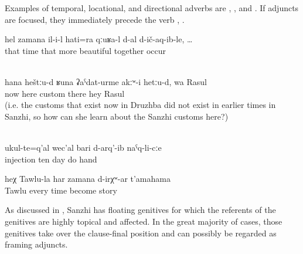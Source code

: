 Examples of temporal, locational, and directional adverbs are , , and  . If adjuncts are focused, they immediately precede the verb , .
%
\begin{exe}
	\ex	\label{ex:‎At that time he embellished his story even more}
	\gll	hel	zamana	il-i-l	hati=ra	qːuʁa-l	d-al d-ič-aq-ib-le, \ldots\\
		that	time	that	more	beautiful	\tsc{npl-}together	occur\\
	\glt	{}

	\\\label{ex:‎Now such customs as here were not there, Rasul}%
	\gll	hana	heštːu-d	ʁuna	ʡaˁdat-urme	akːʷ-i	hetːu-d,	wa	Rasul\\
		now	here		custom		there	hey	Rasul\\
	\glt	{} (i.e. the customs that exist now in Druzhba did not exist in earlier times in Sanzhi, so how can she learn about the Sanzhi customs here?)
	
	
	\\	\label{ex:‎‎‎They made injections into the hand for ten days}
	\gll	ukul-te=q'al	wec'al	bari	d-arq'-ib	naˁq-li-cːe\\
		injection	ten	day	do	hand\\
	\glt	{}


	\ex	\label{ex:‎With Tawlu always such stories happen}
	\gll	heχ	Tawlu-la	har	zamana	d-irχʷ-ar	t'amahama\\
			Tawlu	every	time	become	story\\
	\glt	{}
\end{exe}

As discussed in , Sanzhi has floating genitives for which the referents of the genitives are highly topical and affected. In the great majority of cases, those genitives take over the clause-final position and can possibly be regarded as framing adjuncts.

